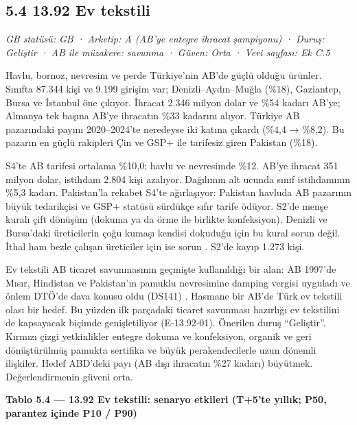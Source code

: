 \hypertarget{nace_kartlar_13-15-54-1392-ev-tekstili}{%
\subsection{5.4 13.92 Ev tekstili}\label{nace_kartlar_13-15-54-1392-ev-tekstili}}

\emph{GB statüsü: GB · Arketip: A (AB'ye entegre ihracat şampiyonu) · Duruş: Geliştir · AB ile müzakere: savunma · Güven: Orta · Veri sayfası: Ek C.5}

Havlu, bornoz, nevresim ve perde Türkiye'nin AB'de güçlü olduğu ürünler. Sınıfta 87.344 kişi ve 9.199 girişim var; Denizli--Aydın--Muğla (\%18), Gaziantep, Bursa ve İstanbul öne çıkıyor. İhracat 2.346 milyon dolar ve \%54 kadarı AB'ye; Almanya tek başına AB'ye ihracatın \%33 kadarını alıyor. Türkiye AB pazarındaki payını 2020--2024'te neredeyse iki katına çıkardı (\%4,4 → \%8,2). Bu pazarın en güçlü rakipleri Çin ve GSP+ ile tarifesiz giren Pakistan (\%18).

S4'te AB tarifesi ortalama \%10,0; havlu ve nevresimde \%12. AB'ye ihracat 351 milyon dolar, istihdam 2.804 kişi azalıyor. Dağılımın alt ucunda sınıf istihdamının \%5,3 kadarı. Pakistan'la rekabet S4'te ağırlaşıyor: Pakistan havluda AB pazarının büyük tedarikçisi ve GSP+ statüsü sürdükçe sıfır tarife ödüyor. S2'de menşe kuralı çift dönüşüm (dokuma ya da örme ile birlikte konfeksiyon). Denizli ve Bursa'daki üreticilerin çoğu kumaşı kendisi dokuduğu için bu kural sorun değil. İthal ham bezle çalışan üreticiler için ise sorun \etiketH{}. S2'de kayıp 1.273 kişi.

Ev tekstili AB ticaret savunmasının geçmişte kullanıldığı bir alan: AB 1997'de Mısır, Hindistan ve Pakistan'ın pamuklu nevresimine damping vergisi uyguladı ve önlem DTÖ'de dava konusu oldu (DS141) \etiketV{}. Hasmane bir AB'de Türk ev tekstili olası bir hedef. Bu yüzden ilk parçadaki ticaret savunması hazırlığı ev tekstilini de kapsayacak biçimde genişletiliyor (E-13.92-01). Önerilen duruş ``Geliştir''. Kırmızı çizgi yetkinlikler entegre dokuma ve konfeksiyon, organik ve geri dönüştürülmüş pamukta sertifika ve büyük perakendecilerle uzun dönemli ilişkiler. Hedef ABD'deki payı (AB dışı ihracatın \%27 kadarı) büyütmek. Değerlendirmenin güveni orta.


\textbf{Tablo 5.4 --- 13.92 Ev tekstili: senaryo etkileri (T+5'te yıllık; P50, parantez içinde P10 / P90)}

\nopagebreak[4]

